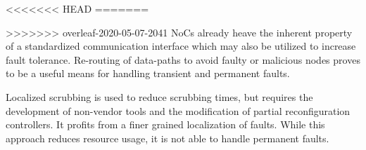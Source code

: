 <<<<<<< HEAD
=======

>>>>>>> overleaf-2020-05-07-2041
\glspl{NoC} already heave the inherent property of a standardized communication interface which may also be utilized to increase fault tolerance.
Re-routing of data-paths to avoid faulty or malicious nodes proves to be a useful means for handling transient and permanent faults.

Localized scrubbing is used to reduce scrubbing times, but requires the development of non-vendor tools and the modification of partial reconfiguration controllers.
It profits from a finer grained localization of faults.
While this approach reduces resource usage, it is not able to handle permanent faults. 
